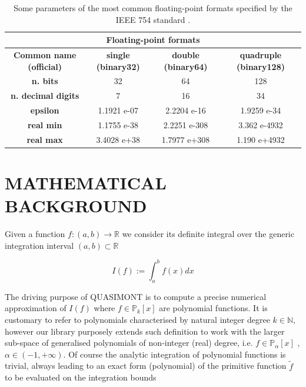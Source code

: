 \documentclass[a4paper, twosided]{book}
\begin{document}
\begin{table}[H]
\centering
\begin{tabular}{|c||c|c|c|}
\hline
\multicolumn{4}{|c|}{\textbf{Floating-point formats}} \\
\hline
\textbf{Common name (official)} & \textbf{single (binary32)} & \textbf{double (binary64)} & \textbf{quadruple (binary128)} \\
\hline
\textbf{n. bits}                & 32          & 64           & 128          \\
\textbf{n. decimal digits}      & 7           & 16           & 34           \\
\textbf{epsilon}                & 1.1921 e-07 & 2.2204 e-16  & 1.9259 e-34  \\
\textbf{real min}                    & 1.1755 e-38 & 2.2251 e-308 & 3.362 e-4932 \\
\textbf{real max}                    & 3.4028 e+38 & 1.7977 e+308 & 1.190 e+4932 \\
\hline
\end{tabular}
  \caption{Some parameters of the most common floating-point formats specified by the IEEE 754 standard \cite{IEEE754}.}
  \label{table1.1}
\end{table}

\newpage
\section[Mathematical background]{\changefont MATHEMATICAL BACKGROUND}\label{Sec1.2}

\noindent
Given a function $f:(a,b)\to\mathbb{R}$ we consider its definite integral over the generic integration interval $(a,b)\subset\mathbb{R}$

\begin{equation}\label{eq1.1}
    I(f):=\int_{a}^{b}f(x)dx
\end{equation}

\noindent
The driving purpose of QUASIMONT is to compute a precise numerical approximation of $I(f)$ where $f\in\mathbb{P}_{k}[x]$ are polynomial functions. It is customary to refer to polynomials characterised by natural integer degree $k\in\mathbb{N}$, however our library purposely extends such definition to work with the larger sub-space of generalised polynomials of non-integer (real) degree, i.e. $f\in\mathbb{P}_{\alpha}[x]$ , $\alpha\in(-1,+\infty)$. Of course the analytic integration of polynomial functions is trivial, always leading to an exact form (polynomial) of the primitive function $\tilde{f}$ to be evaluated on the integration bounds
\end{document}
